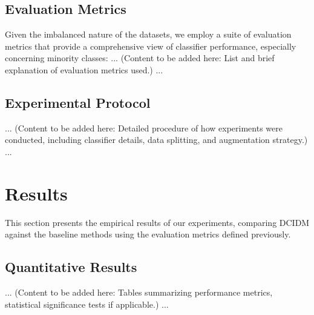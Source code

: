 \documentclass{article}
\begin{document}
\subsection{Evaluation Metrics}
Given the imbalanced nature of the datasets, we employ a suite of evaluation metrics that provide a comprehensive view of classifier performance, especially concerning minority classes:
... (Content to be added here: List and brief explanation of evaluation metrics used.) ...

\subsection{Experimental Protocol}
... (Content to be added here: Detailed procedure of how experiments were conducted, including classifier details, data splitting, and augmentation strategy.) ...

\section{Results}
This section presents the empirical results of our experiments, comparing DCIDM against the baseline methods using the evaluation metrics defined previously.

\subsection{Quantitative Results}
... (Content to be added here: Tables summarizing performance metrics, statistical significance tests if applicable.) ...
\end{document}
